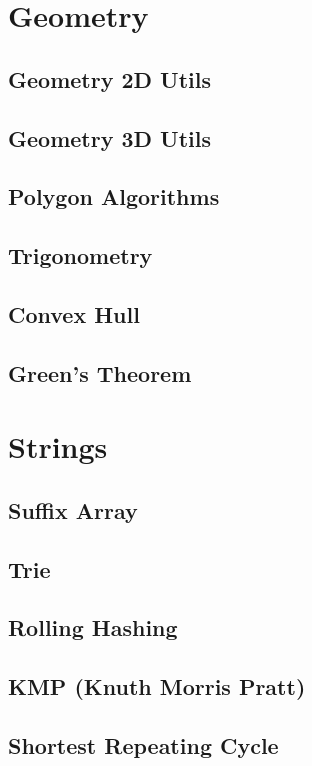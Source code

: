 \documentclass[10pt,landscape,twocolumn,a4paper,notitlepage]{article}
\begin{document}
\section{Geometry}

  \subsection{Geometry 2D Utils}
  

  \subsection{Geometry 3D Utils}
  

  \subsection{Polygon Algorithms}
  

  \subsection{Trigonometry}
     

  \subsection{Convex Hull}
  

  \subsection{Green's Theorem}
  

\section{Strings}
  \subsection{Suffix Array}
  

  \subsection{Trie}
  

  \subsection{Rolling Hashing}
  

  \subsection{KMP (Knuth Morris Pratt)}
  

  \subsection{Shortest Repeating Cycle}
  
\end{document}
